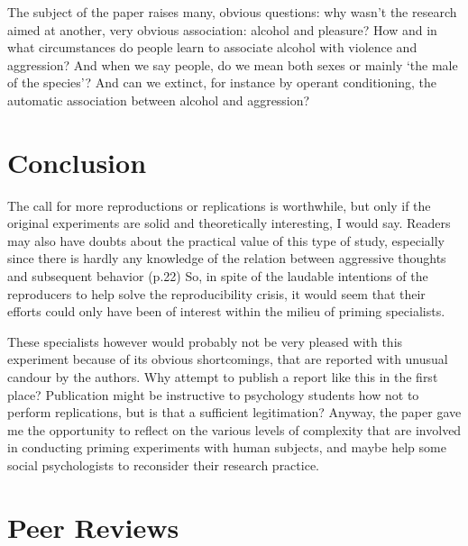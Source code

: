 \documentclass[twocolumn, serif, review, authordate]{jote-article}
\begin{document}
The subject of the paper raises many, obvious questions: why wasn't the research aimed at another, very obvious association: alcohol and pleasure? How and in what circumstances do people learn to associate alcohol with violence and aggression? And when we say people, do we mean both sexes or mainly `the male of the species'? And can we extinct, for instance by operant conditioning, the automatic association between alcohol and aggression? 


{}
\section*{Conclusion}
\gotoreview
\label{sec:conclusion}
\noindent The call for more reproductions or replications is worthwhile, but only if the original experiments are solid and theoretically interesting, I would say. Readers may also have doubts about the practical value of this type of study, especially since there is hardly any knowledge of the relation between aggressive thoughts and subsequent behavior (p.22) So, in spite of the laudable intentions of the reproducers to help solve the reproducibility crisis, it would seem that their efforts could only have been of interest within the milieu of priming specialists.
 
These specialists however would probably not be very pleased with this experiment because of its obvious shortcomings, that are reported with unusual candour by the authors. Why attempt to publish a report like this in the first place? Publication might be instructive to psychology students how not to perform replications, but is that a sufficient legitimation? Anyway, the paper gave me the opportunity to reflect on the various levels of complexity that are involved in conducting priming experiments with human subjects, and maybe help some social psychologists to reconsider their research practice.

\nocite{*}

\newpage


{}
\section*{Peer Reviews}
\label{sec:reviews}
\end{document}
